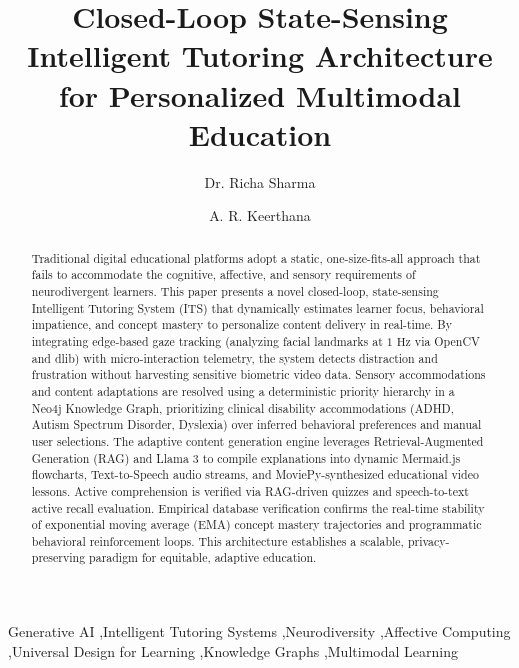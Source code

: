\documentclass[final,5p,times,twocolumn,authoryear]{elsarticle}
\begin{document}
\begin{frontmatter}

\title{Closed-Loop State-Sensing Intelligent Tutoring Architecture for Personalized Multimodal Education}
\author[inst1]{Dr. Richa Sharma}
\address[inst1]{Department of Computer Science and Engineering}
\author[inst2]{A. R. Keerthana}
\address[inst2]{Department of Computer Science and Engineering}

\begin{abstract}
Traditional digital educational platforms adopt a static, one-size-fits-all approach that fails to accommodate the cognitive, affective, and sensory requirements of neurodivergent learners. This paper presents a novel closed-loop, state-sensing Intelligent Tutoring System (ITS) that dynamically estimates learner focus, behavioral impatience, and concept mastery to personalize content delivery in real-time. By integrating edge-based gaze tracking (analyzing facial landmarks at $1\text{ Hz}$ via OpenCV and dlib) with micro-interaction telemetry, the system detects distraction and frustration without harvesting sensitive biometric video data. Sensory accommodations and content adaptations are resolved using a deterministic priority hierarchy in a Neo4j Knowledge Graph, prioritizing clinical disability accommodations (ADHD, Autism Spectrum Disorder, Dyslexia) over inferred behavioral preferences and manual user selections. The adaptive content generation engine leverages Retrieval-Augmented Generation (RAG) and Llama 3 to compile explanations into dynamic Mermaid.js flowcharts, Text-to-Speech audio streams, and MoviePy-synthesized educational video lessons. Active comprehension is verified via RAG-driven quizzes and speech-to-text active recall evaluation. Empirical database verification confirms the real-time stability of exponential moving average (EMA) concept mastery trajectories and programmatic behavioral reinforcement loops. This architecture establishes a scalable, privacy-preserving paradigm for equitable, adaptive education.
\end{abstract}

\begin{keyword}
Generative AI \sep Intelligent Tutoring Systems \sep Neurodiversity \sep Affective Computing \sep Universal Design for Learning \sep Knowledge Graphs \sep Multimodal Learning
\end{keyword}

\end{frontmatter}
\end{document}
